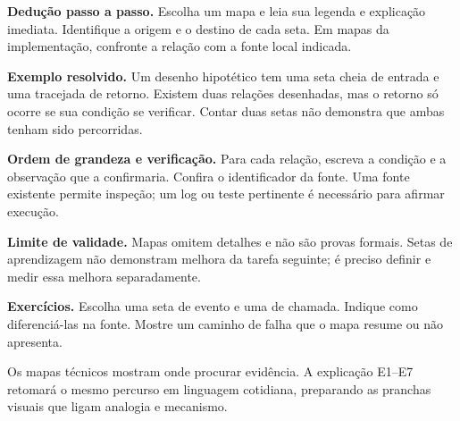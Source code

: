 \begin{metodo}
\textbf{Dedução passo a passo.} Escolha um mapa e leia sua legenda e explicação imediata. Identifique a origem e o destino de cada seta. Em mapas da implementação, confronte a relação com a fonte local indicada.
\end{metodo}

\begin{resultado}
\textbf{Exemplo resolvido.} Um desenho hipotético tem uma seta cheia de entrada e uma tracejada de retorno. Existem duas relações desenhadas, mas o retorno só ocorre se sua condição se verificar. Contar duas setas não demonstra que ambas tenham sido percorridas.
\end{resultado}

\begin{resultado}
\textbf{Ordem de grandeza e verificação.} Para cada relação, escreva a condição e a observação que a confirmaria. Confira o identificador da fonte. Uma fonte existente permite inspeção; um log ou teste pertinente é necessário para afirmar execução.
\end{resultado}

\begin{aviso}
\textbf{Limite de validade.} Mapas omitem detalhes e não são provas formais. Setas de aprendizagem não demonstram melhora da tarefa seguinte; é preciso definir e medir essa melhora separadamente.
\end{aviso}

\begin{resultado}
\textbf{Exercícios.} Escolha uma seta de evento e uma de chamada. Indique como diferenciá-las na fonte. Mostre um caminho de falha que o mapa resume ou não apresenta.
\end{resultado}

Os mapas técnicos mostram onde procurar evidência. A explicação E1–E7 retomará o mesmo percurso em linguagem cotidiana, preparando as pranchas visuais que ligam analogia e mecanismo.
